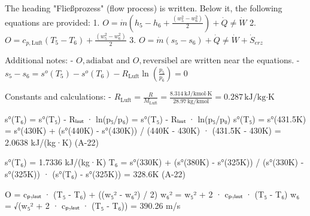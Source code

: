 The heading "Fließprozess" (flow process) is written. Below it, the following equations are provided:  
1. \( O = \dot{m} (h_5 - h_6 + \frac{(w_5^2 - w_6^2)}{2}) + \dot{Q} \neq \dot{W} \)  
2. \( O = c_{p,\text{Luft}} (T_5 - T_6) + \frac{(w_5^2 - w_6^2)}{2} \)  
3. \( O = \dot{m} (s_5 - s_6) + \dot{Q} \neq \dot{W} + \dot{S}_{erz} \)  

Additional notes:  
- \( O, \text{adiabat} \) and \( O, \text{reversibel} \) are written near the equations.  
- \( s_5 - s_6 = s^o(T_5) - s^o(T_6) - R_{\text{Luft}} \ln(\frac{p_5}{p_6}) = 0 \)  

Constants and calculations:  
- \( R_{\text{Luft}} = \frac{R}{M_{\text{Luft}}} = \frac{8.314 \, \text{kJ/kmol·K}}{28.97 \, \text{kg/kmol}} = 0.287 \, \text{kJ/kg·K} \)

s°(T₆) = s°(T₅) - Rₗₐᵤₜ · ln(p₅/p₆) = s°(T₅) - Rₗₐᵤₜ · ln(p₅/p₀)  
s°(T₅) = s°(431.5K) = s°(430K) + (s°(440K) - s°(430K)) / (440K - 430K) · (431.5K - 430K)  
= 2.0638 kJ/(kg·K) (A-22)  

s°(T₆) = 1.7336 kJ/(kg·K)  
T₆ = s°(330K) + (s°(380K) - s°(325K)) / (s°(330K) - s°(325K)) · (s°(T₆) - s°(325K))  
= 328.6K (A-22)  

O = cₚ,ₗₐᵤₜ · (T₅ - T₆) + ((w₅² - w₆²) / 2)  
w₆² = w₅² + 2 · cₚ,ₗₐᵤₜ · (T₅ - T₆)  
w₆ = √(w₅² + 2 · cₚ,ₗₐᵤₜ · (T₅ - T₆)) = 390.26 m/s